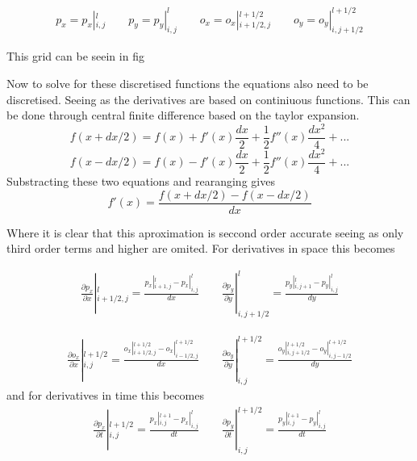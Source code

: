 \documentclass{article}
\begin{document}
\begin{equation}
\begin{gathered}
p_x=p_x|_{i,j}^l \qquad
p_y= p_y|_{i,j}^l \qquad
o_x= o_x|_{i+1/2,j}^{l+1/2}  \qquad
o_y= o_y|_{i,j+1/2}^{l+1/2}
\end{gathered}
\end{equation}


This grid can be seein in fig

Now to solve for these discretised functions the equations also need to be discretised. Seeing as the derivatives are based on continiuous functions. This can be done through central finite difference based on the taylor expansion.
\begin{equation}
    f(x+dx/2)=f(x)+f'(x)\frac{dx}{2}+\frac{1}2{}f''(x)\frac{dx^2}{4}+...
\end{equation}
\begin{equation}
    f(x-dx/2)=f(x)-f'(x)\frac{dx}{2}+\frac{1}2{}f''(x)\frac{dx^2}{4}+...
\end{equation}
Substracting these two equations and rearanging gives
\begin{equation}
    f'(x)=\frac{f(x+dx/2)-f(x-dx/2)}{dx}
\end{equation}

Where it is clear that this aproximation is seccond order accurate seeing as only third order terms and higher are omited.
For derivatives in space this becomes

\begin{equation}
\begin{gathered}
\frac{\partial p_x}{\partial x}|_{i+1/2,j}^l = \frac{p_x|_{i+1,j}^l-p_x|_{i,j}^l}{dx} \qquad
\frac{\partial p_y}{\partial y}|_{i,j+1/2}^l = \frac{p_y|_{i,j+1}^l-p_y|_{i,j}^l}{dy}  
\end{gathered}
\end{equation}

\begin{equation}
\begin{gathered}
\frac{\partial o_x}{\partial x}|_{i,j}^{l+1/2} = \frac{o_x|_{i+1/2,j}^{l+1/2}-o_x|_{i-1/2,j}^{l+1/2}}{dx} \qquad
\frac{\partial o_y}{\partial y}|_{i,j}^{l+1/2} = \frac{o_y|_{i,j+1/2}^{l+1/2}-o_y|_{i,j-1/2}^{l+1/2}}{dy} 
\end{gathered}
\end{equation}
and for derivatives in time this becomes
\begin{equation}
\begin{gathered}
\frac{\partial p_x}{\partial t}|_{i,j}^{l+1/2} = \frac{p_x|_{i,j}^{l+1} -p_x|_{i,j}^{l} }{dt} \qquad
\frac{\partial p_y}{\partial t}|_{i,j}^{l+1/2}  = \frac{p_y|_{i,j}^{l+1} -p_y|_{i,j}^{l} }{dt} 
\end{gathered}
\end{equation}
\end{document}
